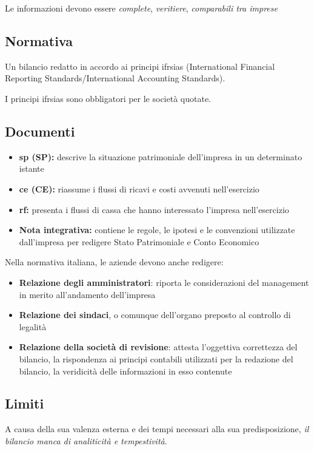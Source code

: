 Le informazioni devono essere \emph{complete}, \emph{veritiere}, \emph{comparabili tra imprese}

\subsection{Normativa}
Un \gls{bilancio} redatto in accordo ai principi \gls{ifrsias} (International Financial
Reporting Standards/International Accounting Standards).

I principi \gls{ifrsias} sono obbligatori per le società quotate.

\subsection{Documenti}

\begin{itemize}
    \item \textbf{\Gls{sp} (SP):} descrive la situazione patrimoniale dell’impresa in un determinato istante
    \item \textbf{\Gls{ce} (CE):} riassume i flussi di ricavi e costi avvenuti nell’esercizio
    \item \textbf{\Gls{rf}:} presenta i flussi di cassa che hanno interessato l’impresa nell’esercizio
    \item \textbf{Nota integrativa:} contiene le regole, le ipotesi e le convenzioni utilizzate dall’impresa per redigere Stato Patrimoniale e Conto Economico
\end{itemize}

Nella normativa italiana, le aziende devono anche redigere:
\begin{itemize}
    \item \textbf{Relazione degli amministratori}: riporta le considerazioni del management in merito all’andamento dell’impresa
    \item \textbf{Relazione dei sindaci}, o comunque dell’organo preposto al controllo di legalità
    \item \textbf{Relazione della società di revisione}: attesta l’oggettiva correttezza del bilancio, la rispondenza ai principi contabili utilizzati per la redazione del bilancio, la veridicità delle informazioni in esso contenute
\end{itemize}

\subsection{Limiti}
A causa della sua valenza esterna e dei tempi necessari alla sua  predisposizione,
\emph{il bilancio manca di analiticità e tempestività}.

